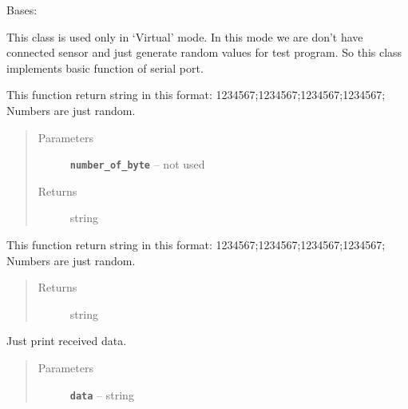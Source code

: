 \documentclass[12pt]{article}
\begin{document}
\begin{fulllineitems}
\label{index:generator.Generator}
Bases: 

This class is used only in `Virtual' mode. In this mode we are don't have
connected sensor and just generate random values for test program. So this
class implements basic function of serial port.

\begin{fulllineitems}
\label{index:generator.Generator.read}
This function return string in this format:
1234567;1234567;1234567;1234567;
Numbers are just random.
\begin{quote}\begin{description}
\item[{Parameters}] \leavevmode
\textbf{\texttt{number\_of\_byte}} -- not used

\item[{Returns}] \leavevmode
string

\end{description}\end{quote}

\end{fulllineitems}


\begin{fulllineitems}
\label{index:generator.Generator.readline}
This function return string in this format:
1234567;1234567;1234567;1234567;
Numbers are just random.
\begin{quote}\begin{description}
\item[{Returns}] \leavevmode
string

\end{description}\end{quote}

\end{fulllineitems}


\begin{fulllineitems}
\label{index:generator.Generator.write}
Just print received data.
\begin{quote}\begin{description}
\item[{Parameters}] \leavevmode
\textbf{\texttt{data}} -- string

\end{description}\end{quote}

\end{fulllineitems}


\end{fulllineitems}
\end{document}
